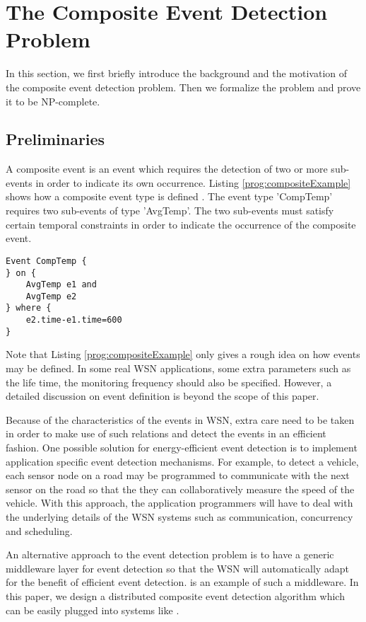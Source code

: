 \section{The Composite Event Detection Problem}
\label{sec:system_model}
In this section, we first briefly introduce the background and the motivation of the composite event detection problem. Then we formalize the problem and prove it to be NP-complete.

\subsection{Preliminaries}
A composite event is an event which requires the detection of two or more sub-events in order to indicate its own occurrence. Listing \ref{prog:compositeExample} shows how a composite event type is defined \cite{lai:psware}. The event type 'CompTemp' requires two sub-events of type 'AvgTemp'. The two sub-events must satisfy certain temporal constraints in order to indicate the occurrence of the composite event.
\begin{lstlisting}[caption=Example of a composite event, label=prog:compositeExample]
Event CompTemp {
} on {
	AvgTemp e1 and
	AvgTemp e2
} where {
	e2.time-e1.time=600
}
\end{lstlisting}

Note that Listing \ref{prog:compositeExample} only gives a rough idea on how events may be defined. In some real WSN applications, some extra parameters such as the life time, the monitoring frequency should also be specified. However, a detailed discussion on event definition is beyond the scope of this paper.

Because of the characteristics of the events in WSN, extra care need to be taken in order to make use of such relations and detect the events in an efficient fashion. One possible solution for energy-efficient event detection is to implement application specific event detection mechanisms. For example, to detect a vehicle, each sensor node on a road may be programmed to communicate with the next sensor on the road so that the they can collaboratively measure the speed of the vehicle. With this approach, the application programmers will have to deal with the underlying details of the WSN systems such as communication, concurrency and scheduling.

An alternative approach to the event detection problem is to have a generic middleware layer for event detection so that the WSN will automatically adapt for the benefit of efficient event detection. \cite{lai:psware} is an example of such a middleware. In this paper, we design a distributed composite event detection algorithm which can be easily plugged into systems like \cite{lai:psware}.


